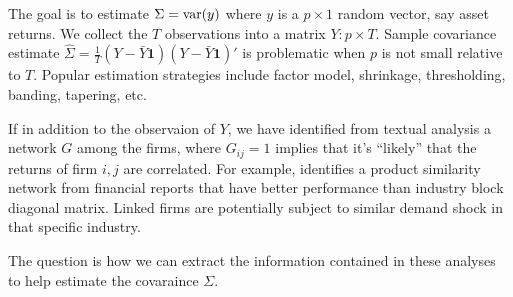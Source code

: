 The goal is to estimate \(\Sigma =\operatorname{var}(y)\) where \(y\) is a \(p \times 1\) random vector, say asset returns. We collect the \(T\) observations into a matrix \(Y:p\times T\). Sample covariance estimate \(\hat{\Sigma} = \frac{1}{T} (Y - \bar{Y}\mathbf{1})(Y - \bar{Y}\mathbf{1})'\) is problematic when \(p\) is not small relative to \(T\). Popular estimation strategies include factor model, shrinkage, thresholding, banding, tapering, etc. 

If in addition to the observaion of \(Y\), we have identified from textual analysis a network \(G\) among the firms, where \(G_{ij} = 1\) implies that it's ``likely'' that the returns of firm \(i,j\) are correlated. For example, \cite{hoberg2016TextBasedNetwork} identifies a product similarity network from financial reports that have better performance than industry block diagonal matrix. Linked firms are potentially subject to similar demand shock in that specific industry. 

The question is how we can extract the information contained in these analyses to help estimate the covaraince \(\Sigma\).

